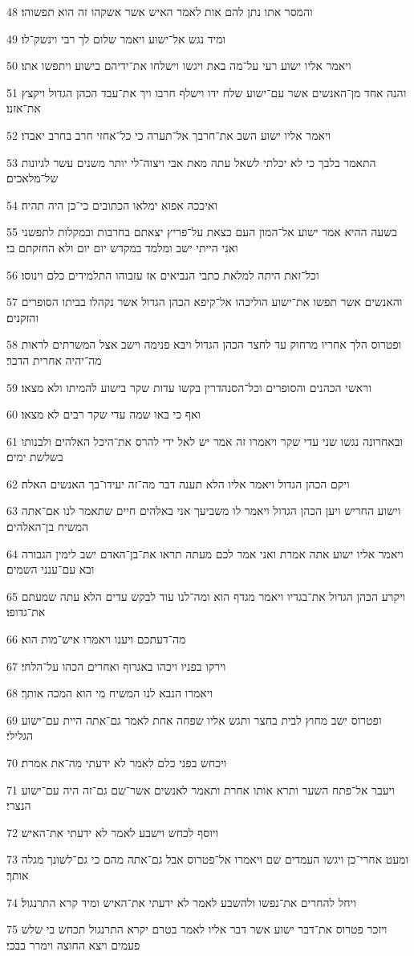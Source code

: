 \par 48 והמסר אתו נתן להם אות לאמר האיש אשר אשקהו זה הוא תפשוהו׃
\par 49 ומיד נגש אל־ישוע ויאמר שלום לך רבי וינשק־לו׃
\par 50 ויאמר אליו ישוע רעי על־מה באת ויגשו וישלחו את־ידיהם בישוע ויתפשו אתו׃
\par 51 והנה אחד מן־האנשים אשר עם־ישוע שלח ידו וישלף חרבו ויך את־עבד הכהן הגדול ויקצץ את־אזנו׃
\par 52 ויאמר אליו ישוע השב את־חרבך אל־תערה כי כל־אחזי חרב בחרב יאבדו׃
\par 53 התאמר בלבך כי לא יכלתי לשאל עתה מאת אבי ויצוה־לי יותר משנים עשר לגיונות של־מלאכים׃
\par 54 ואיככה אפוא ימלאו הכתובים כי־כן היה תהיה׃
\par 55 בשעה ההיא אמר ישוע אל־המון העם כצאת על־פריץ יצאתם בחרבות ובמקלות לתפשני ואני הייתי ישב ומלמד במקדש יום יום ולא החזקתם בי׃
\par 56 וכל־זאת היתה למלאת כתבי הנביאים אז עזבוהו התלמידים כלם וינוסו׃
\par 57 והאנשים אשר תפשו את־ישוע הוליכהו אל־קיפא הכהן הגדול אשר נקהלו בביתו הסופרים והזקנים׃
\par 58 ופטרוס הלך אחריו מרחוק עד לחצר הכהן הגדול ויבא פנימה וישב אצל המשרתים לראות מה־יהיה אחרית הדבר׃
\par 59 וראשי הכהנים והסופרים וכל־הסנהדרין בקשו עדות שקר בישוע להמיתו ולא מצאו׃
\par 60 ואף כי באו שמה עדי שקר רבים לא מצאו׃
\par 61 ובאחרונה נגשו שני עדי שקר ויאמרו זה אמר יש לאל ידי להרס את־היכל האלהים ולבנותו בשלשת ימים׃
\par 62 ויקם הכהן הגדול ויאמר אליו הלא תענה דבר מה־זה יעידו־בך האנשים האלה׃
\par 63 וישוע החריש ויען הכהן הגדול ויאמר לו משביעך אני באלהים חיים שתאמר לנו אם־אתה המשיח בן־האלהים׃
\par 64 ויאמר אליו ישוע אתה אמרת ואני אמר לכם מעתה תראו את־בן־האדם ישב לימין הגבורה ובא עם־ענני השמים׃
\par 65 ויקרע הכהן הגדול את־בגדיו ויאמר מגדף הוא ומה־לנו עוד לבקש עדים הלא עתה שמעתם את־גדופו׃
\par 66 מה־דעתכם ויענו ויאמרו איש־מות הוא׃
\par 67 וירקו בפניו ויכהו באגרוף ואחרים הכהו על־הלחי׃
\par 68 ויאמרו הנבא לנו המשיח מי הוא המכה אותך׃
\par 69 ופטרוס ישב מחוץ לבית בחצר ותגש אליו שפחה אחת לאמר גם־אתה היית עם־ישוע הגלילי׃
\par 70 ויכחש בפני כלם לאמר לא ידעתי מה־את אמרת׃
\par 71 ויעבר אל־פתח השער ותרא אותו אחרת ותאמר לאנשים אשר־שם גם־זה היה עם־ישוע הנצרי׃
\par 72 ויוסף לכחש וישבע לאמר לא ידעתי את־האיש׃
\par 73 ומעט אחרי־כן ויגשו העמדים שם ויאמרו אל־פטרוס אבל גם־אתה מהם כי גם־לשונך מגלה אותך׃
\par 74 ויחל להחרים את־נפשו ולהשבע לאמר לא ידעתי את־האיש ומיד קרא התרנגול׃
\par 75 ויזכר פטרוס את־דבר ישוע אשר דבר אליו לאמר בטרם יקרא התרנגול תכחש בי שלש פעמים ויצא החוצה וימרר בבכי׃

